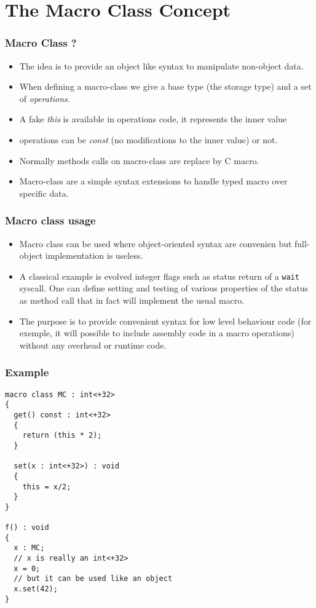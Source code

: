 \documentclass[pdftex]{beamer}
\begin{document}
\section{The Macro Class Concept}

\begin{frame}
  \frametitle{Macro Class ?}
  \begin{itemize}
  \item The idea is to provide an object like syntax to manipulate
    non-object data.
  \item When defining a macro-class we give a base type (the storage
    type) and a set of \emph{operations}.
  \item A fake \emph{this} is available in operations code, it
    represents the inner value
  \item operations can be \emph{const} (no modifications to the inner
    value) or not.
  \item Normally methods calls on macro-class are replace by C macro.
  \item Macro-class are a simple syntax extensions to handle typed
    macro over specific data.
  \end{itemize}
\end{frame}

\begin{frame}
  \frametitle{Macro class usage}
  \begin{itemize}
  \item Macro class can be used where object-oriented syntax are
    convenien but full-object implementation is useless.
  \item A classical example is evolved integer flags such as status
    return of a \texttt{wait} syscall. One can define setting and
    testing of various properties of the status as method call that in
    fact will implement the usual macro.
  \item The purpose is to provide convenient syntax for low level
    behaviour code (for exemple, it will possible to include assembly
    code in a macro operations) without any overhead or runtime code.
  \end{itemize}
\end{frame}

\begin{frame}
  \frametitle{Example}
  \footnotesize
\begin{verbatim}
macro class MC : int<+32>
{
  get() const : int<+32>
  {
    return (this * 2);
  }

  set(x : int<+32>) : void
  {
    this = x/2;
  }
}

f() : void
{
  x : MC;
  // x is really an int<+32>
  x = 0;
  // but it can be used like an object
  x.set(42);
}
\end{verbatim}
\end{frame}
\end{document}
